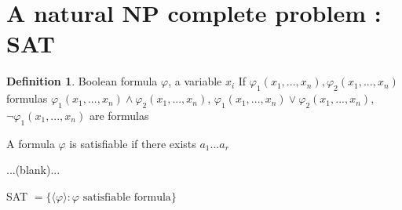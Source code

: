\documentclass{article}
\theoremstyle{definition}
\newtheorem{definition}{Definition}
\theoremstyle{remark}
\begin{document}
\section{A natural NP complete problem : SAT}
\begin{definition}
	Boolean formula $\varphi$,
	a variable $x_i$
	If $\varphi_1(x_1,...,x_n), \varphi_2(x_1,...,x_n)$ formulas
	$\varphi_1(x_1,...,x_n) \wedge \varphi_2(x_1,...,x_n)$,
	$\varphi_1(x_1,...,x_n) \vee \varphi_2(x_1,...,x_n)$,
	$\neg \varphi_1(x_1,...,x_n)$ are formulas
	
	A formula $\varphi$ is satisfiable  if there exists $a_1...a_r$
	
	...(blank)...
	
	SAT $ = \{\langle\varphi\rangle : \varphi \text{ satisfiable formula}\}$
\end{definition}
\end{document}
